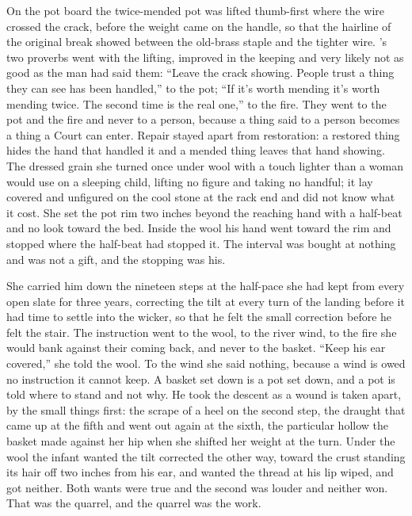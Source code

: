 On the pot board the twice-mended pot was lifted thumb-first where the wire crossed the crack, before the weight came on the handle, so that the hairline of the original break showed between the old-brass staple and the tighter wire. 's two proverbs went with the lifting, improved in the keeping and very likely not as good as the man had said them: “Leave the crack showing. People trust a thing they can see has been handled,” to the pot; “If it's worth mending it's worth mending twice. The second time is the real one,” to the fire. They went to the pot and the fire and never to a person, because a thing said to a person becomes a thing a Court can enter. Repair stayed apart from restoration: a restored thing hides the hand that handled it and a mended thing leaves that hand showing. The dressed grain she turned once under wool with a touch lighter than a woman would use on a sleeping child, lifting no figure and taking no handful; it lay covered and unfigured on the cool stone at the rack end and did not know what it cost. She set the pot rim two inches beyond the reaching hand with a half-beat and no look toward the bed. Inside the wool his hand went toward the rim and stopped where the half-beat had stopped it. The interval was bought at nothing and was not a gift, and the stopping was his.

She carried him down the nineteen steps at the half-pace she had kept from every open slate for three years, correcting the tilt at every turn of the landing before it had time to settle into the wicker, so that he felt the small correction before he felt the stair. The instruction went to the wool, to the river wind, to the fire she would bank against their coming back, and never to the basket. “Keep his ear covered,” she told the wool. To the wind she said nothing, because a wind is owed no instruction it cannot keep. A basket set down is a pot set down, and a pot is told where to stand and not why. He took the descent as a wound is taken apart, by the small things first: the scrape of a heel on the second step, the draught that came up at the fifth and went out again at the sixth, the particular hollow the basket made against her hip when she shifted her weight at the turn. Under the wool the infant wanted the tilt corrected the other way, toward the crust standing its hair off two inches from his ear, and wanted the thread at his lip wiped, and got neither. Both wants were true and the second was louder and neither won. That was the quarrel, and the quarrel was the work.

